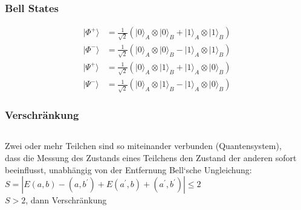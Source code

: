 \begin{frame}
	\frametitle{Bell States}
	\begin{align*}
		\lvert \Phi^+ \rangle &= \frac{1}{\sqrt{2}} \left( \lvert 0 \rangle_A \otimes \lvert 0 \rangle_B + \lvert 1 \rangle_A \otimes \lvert 1 \rangle_B \right) \\
		\lvert \Phi^- \rangle &= \frac{1}{\sqrt{2}} \left( \lvert 0 \rangle_A \otimes \lvert 0 \rangle_B - \lvert 1 \rangle_A \otimes \lvert 1 \rangle_B \right) \\
		\lvert \Psi^+ \rangle &= \frac{1}{\sqrt{2}} \left( \lvert 0 \rangle_A \otimes \lvert 1 \rangle_B + \lvert 1 \rangle_A \otimes \lvert 0 \rangle_B \right) \\
		\lvert \Psi^- \rangle &= \frac{1}{\sqrt{2}} \left( \lvert 0 \rangle_A \otimes \lvert 1 \rangle_B - \lvert 1 \rangle_A \otimes \lvert 0 \rangle_B \right)
	\end{align*}
\end{frame}

\begin{frame}
	\frametitle{Verschr{\"a}nkung}
	\begin{columns}
		\begin{column}{0.6\linewidth}
			Zwei oder mehr Teilchen sind so miteinander verbunden (Quantensystem), dass die Messung des Zustands eines Teilchens den Zustand der anderen sofort beeinflusst, unabhängig von der Entfernung
			\vspace{0.5em}
			Bell‘sche Ungleichung:\\
			$S = |E(a,b)-(a,b^{'})+E(a^{'},b)+(a^{'},b^{'})| \leq 2$\\
			$S > 2$, dann Verschränkung
		\end{column}
		\begin{column}{0.4\linewidth}
		\end{column}
	\end{columns}
\end{frame}


